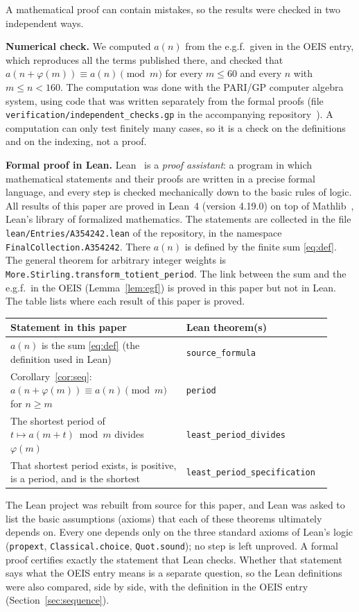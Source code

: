 \documentclass[11pt,a4paper]{article}
\theoremstyle{definition}
\theoremstyle{remark}
\newcommand{\para}[1]{\par\medskip\noindent\textbf{#1}\enspace}
\begin{document}
A mathematical proof can contain mistakes, so the results were checked in two independent ways.

\para{Numerical check.}
We computed $a(n)$ from the e.g.f.\ given in the OEIS entry, which reproduces all the terms published there, and
checked that $a(n+\varphi(m))\equiv a(n)\pmod m$ for every $m\le60$ and every $n$ with $m\le n<160$.
The computation was done with the PARI/GP computer algebra system, using code that was written separately from the
formal proofs (file \texttt{verification/independent\_checks.gp} in the accompanying repository~\cite{repo}).
A computation can only test finitely many cases, so it is a check on the definitions and on the indexing, not a proof.

\para{Formal proof in Lean.}
Lean~\cite{lean} is a \emph{proof assistant}: a program in which mathematical statements and their proofs are written
in a precise formal language, and every step is checked mechanically down to the basic rules of logic. All results of
this paper are proved in Lean~4 (version 4.19.0) on top of Mathlib~\cite{mathlib}, Lean's library of formalized
mathematics. The statements are collected in the file \texttt{lean/Entries/A354242.lean} of the repository,
in the namespace \texttt{FinalCollection.A354242}. There $a(n)$ is defined by the finite sum \eqref{eq:def}. The general theorem for arbitrary integer weights is \texttt{More.Stirling.transform\_totient\_period}. The link between the sum and the e.g.f.\ in the OEIS (Lemma~\ref{lem:egf}) is proved in this paper but not in Lean.
The table lists where each result of this paper is proved.
\begin{center}\small\renewcommand{\arraystretch}{1.25}
\begin{tabular}{>{\raggedright\arraybackslash}p{0.52\linewidth}>{\raggedright\arraybackslash}p{0.4\linewidth}}
\toprule
Statement in this paper & Lean theorem(s)\\
\midrule
$a(n)$ is the sum \eqref{eq:def} (the definition used in Lean) & \texttt{source\_\allowbreak{}formula} \\
Corollary~\ref{cor:seq}: $a(n+\varphi(m))\equiv a(n)\pmod m$ for $n\ge m$ & \texttt{period} \\
The shortest period of $t\mapsto a(m+t)\bmod m$ divides $\varphi(m)$ & \texttt{least\_\allowbreak{}period\_\allowbreak{}divides} \\
That shortest period exists, is positive, is a period, and is the shortest & \texttt{least\_\allowbreak{}period\_\allowbreak{}specification} \\
\bottomrule
\end{tabular}
\end{center}
The Lean project was rebuilt from source for this paper, and Lean was asked to list the basic assumptions (axioms)
that each of these theorems ultimately depends on. Every one depends only on the three standard axioms of Lean's logic
(\texttt{propext}, \texttt{Classical.choice}, \texttt{Quot.sound}); no step is left unproved. A formal proof certifies
exactly the statement that Lean checks. Whether that statement says what the OEIS entry means is a separate question,
so the Lean definitions were also compared, side by side, with the definition in the OEIS entry
(Section~\ref{sec:sequence}).
\end{document}

